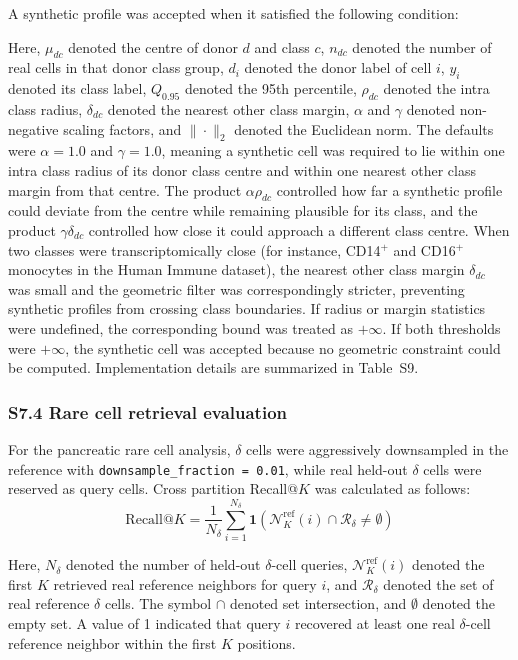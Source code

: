 \documentclass[11pt]{article}
\begin{document}
A synthetic profile was accepted when it satisfied the following condition:

Here, \(\mu_{dc}\) denoted the centre of donor \(d\) and class \(c\), \(n_{dc}\) denoted the number of real cells in that donor class group, \(d_i\) denoted the donor label of cell \(i\), \(y_i\) denoted its class label, \(Q_{0.95}\) denoted the 95th percentile, \(\rho_{dc}\) denoted the intra class radius, \(\delta_{dc}\) denoted the nearest other class margin, \(\alpha\) and \(\gamma\) denoted non-negative scaling factors, and \(\|\cdot\|_2\) denoted the Euclidean norm. The defaults were \(\alpha=1.0\) and \(\gamma=1.0\), meaning a synthetic cell was required to lie within one intra class radius of its donor class centre and within one nearest other class margin from that centre. The product \(\alpha\rho_{dc}\) controlled how far a synthetic profile could deviate from the centre while remaining plausible for its class, and the product \(\gamma\delta_{dc}\) controlled how close it could approach a different class centre. When two classes were transcriptomically close (for instance, CD14\(^{+}\) and CD16\(^{+}\) monocytes in the Human Immune dataset), the nearest other class margin \(\delta_{dc}\) was small and the geometric filter was correspondingly stricter, preventing synthetic profiles from crossing class boundaries. If radius or margin statistics were undefined, the corresponding bound was treated as \(+\infty\). If both thresholds were \(+\infty\), the synthetic cell was accepted because no geometric constraint could be computed. Implementation details are summarized in Table~S9.

\subsubsection*{S7.4 Rare cell retrieval evaluation}

For the pancreatic rare cell analysis, \(\delta\) cells were aggressively downsampled in the reference with \texttt{downsample\_fraction = 0.01}, while real held-out \(\delta\) cells were reserved as query cells. Cross partition Recall@\(K\) was calculated as follows:
\begin{equation}
\mathrm{Recall@}K =
\frac{1}{N_{\delta}}
\sum_{i=1}^{N_{\delta}}
\mathbf{1}\left(
\mathcal{N}_{K}^{\mathrm{ref}}(i) \cap \mathcal{R}_{\delta} \ne \emptyset
\right)
\label{eq:recall_at_k}
\end{equation}

Here, \(N_{\delta}\) denoted the number of held-out \(\delta\)-cell queries, \(\mathcal{N}_{K}^{\mathrm{ref}}(i)\) denoted the first \(K\) retrieved real reference neighbors for query \(i\), and \(\mathcal{R}_{\delta}\) denoted the set of real reference \(\delta\) cells. The symbol \(\cap\) denoted set intersection, and \(\emptyset\) denoted the empty set. A value of 1 indicated that query \(i\) recovered at least one real \(\delta\)-cell reference neighbor within the first \(K\) positions.
\end{document}

